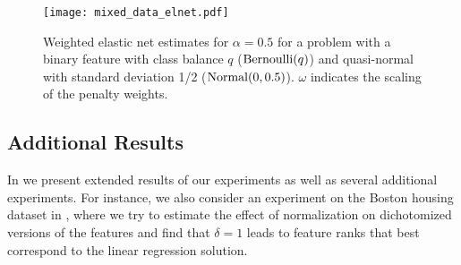 \begin{figure}[htpb]
  \centering
  \texttt{[image: mixed\_data\_elnet.pdf]}
  \caption{%
    Weighted elastic net estimates for \(\alpha = 0.5\) for a problem with a binary
    feature with class balance \(q\) (\(\operatorname{Bernoulli}(q)\)) and quasi-normal
    with standard deviation 1/2 (\(\operatorname{Normal}(0, 0.5)\)). \(\omega\) indicates
    the scaling of the penalty weights.
  }
  \label{fig:mixed-data-elnet}
\end{figure}

\subsection{Additional Results}

In  we present extended results of our experiments as well
as several additional experiments. For instance, we also consider an experiment on the
Boston housing dataset in , where we try to estimate the effect
of normalization on dichotomized versions of the features and find that \(\delta = 1\)
leads to feature ranks that best correspond to the linear regression solution.
